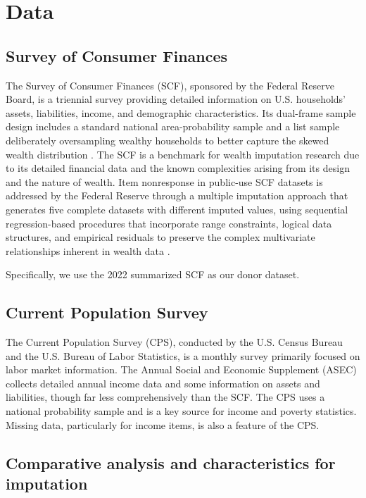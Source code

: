 \section{Data}\label{sec:data}

\subsection{Survey of Consumer Finances}

The Survey of Consumer Finances (SCF), sponsored by the Federal Reserve Board, is a triennial survey providing detailed information on U.S. households' assets, liabilities, income, and demographic characteristics. Its dual-frame sample design includes a standard national area-probability sample and a list sample deliberately oversampling wealthy households to better capture the skewed wealth distribution \citep{barcelo2006imputation}. The SCF is a benchmark for wealth imputation research due to its detailed financial data and the known complexities arising from its design and the nature of wealth. Item nonresponse in public-use SCF datasets is addressed by the Federal Reserve through a multiple imputation approach that generates five complete datasets with different imputed values, using sequential regression-based procedures that incorporate range constraints, logical data structures, and empirical residuals to preserve the complex multivariate relationships inherent in wealth data \citep{kennickell1998multiple}. 

Specifically, we use the 2022 summarized SCF as our donor dataset. 

\subsection{Current Population Survey}

The Current Population Survey (CPS), conducted by the U.S. Census Bureau and the U.S. Bureau of Labor Statistics, is a monthly survey primarily focused on labor market information. The Annual Social and Economic Supplement (ASEC) collects detailed annual income data and some information on assets and liabilities, though far less comprehensively than the SCF. The CPS uses a national probability sample and is a key source for income and poverty statistics. Missing data, particularly for income items, is also a feature of the CPS.

\subsection{Comparative analysis and characteristics for imputation}

